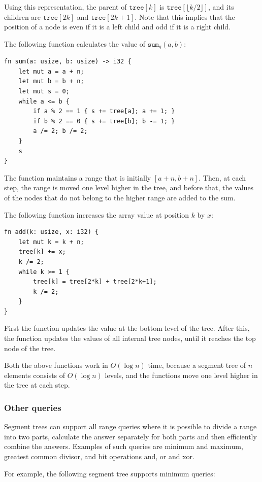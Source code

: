 Using this representation,
the parent of $\texttt{tree}[k]$
is $\texttt{tree}[\lfloor k/2 \rfloor]$,
and its children are $\texttt{tree}[2k]$
and $\texttt{tree}[2k+1]$.
Note that this implies that the position of a node
is even if it is a left child and odd if it is a right child.

The following function
calculates the value of $\texttt{sum}_q(a,b)$:
\begin{lstlisting}
fn sum(a: usize, b: usize) -> i32 {
    let mut a = a + n;
    let mut b = b + n;
    let mut s = 0;
    while a <= b {
        if a % 2 == 1 { s += tree[a]; a += 1; }
        if b % 2 == 0 { s += tree[b]; b -= 1; }
        a /= 2; b /= 2;
    }
    s
}
\end{lstlisting}
The function maintains a range
that is initially $[a+n,b+n]$.
Then, at each step, the range is moved
one level higher in the tree,
and before that, the values of the nodes that do not
belong to the higher range are added to the sum.

The following function increases the array value
at position $k$ by $x$:
\begin{lstlisting}
fn add(k: usize, x: i32) {
    let mut k = k + n;
    tree[k] += x;
    k /= 2;
    while k >= 1 {
        tree[k] = tree[2*k] + tree[2*k+1];
        k /= 2;
    }
}
\end{lstlisting}
First the function updates the value
at the bottom level of the tree.
After this, the function updates the values of all
internal tree nodes, until it reaches
the top node of the tree.

Both the above functions work
in $O(\log n)$ time, because a segment tree
of $n$ elements consists of $O(\log n)$ levels,
and the functions move one level higher
in the tree at each step.

\subsubsection{Other queries}

Segment trees can support all range queries
where it is possible to divide a range into two parts,
calculate the answer separately for both parts
and then efficiently combine the answers.
Examples of such queries are
minimum and maximum, greatest common divisor,
and bit operations and, or and xor.

For example, the following segment tree
supports minimum queries:

